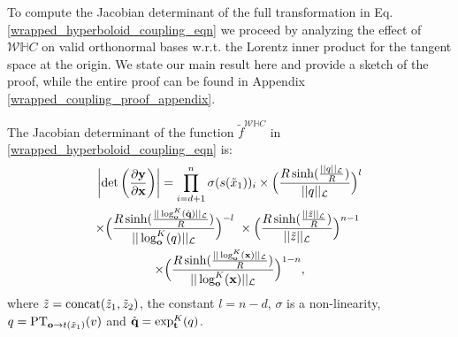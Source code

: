 To compute the Jacobian determinant of the full transformation in Eq. \ref{wrapped_hyperboloid_coupling_eqn} we proceed by analyzing the effect of $\mathcal{W}\mathbb{H}C$ on valid orthonormal bases w.r.t. the Lorentz inner product for the tangent space at the origin. We state our main result here and provide a sketch of the proof, while the entire proof can be found in Appendix \ref{wrapped_coupling_proof_appendix}. 
\begin{prop}
The Jacobian determinant of the function $\tilde{f}^{\mathcal{W}\mathbb{H}C}$ in \eqref{wrapped_hyperboloid_coupling_eqn} is:
\begin{multline}
  \left|\textnormal{det}\left(\frac{\partial\mb{y}}{\partial \mb{x}}\right)\right| = \prod_{i=d+1}^n\sigma(s(\tilde{x}_1))_i \times \Big(\frac{R \sinh(\frac{||q||_{\mathcal{L}}}{R})}{||q||_{\mathcal{L}}}\Big)^{l} \\
  \times \Big(\frac{R\sinh(\frac{||\log_{\textbf{o}}^K(\hat{\textbf{q}})||_{\mathcal{L}}}{R})}{||\log_{\textbf{o}}^K(q)||_{\mathcal{L}}}\Big)^{-l} \ \times  \Big(\frac{R\sinh(\frac{||\tilde{z}||_{\mathcal{L}}}{R})}{||\tilde{z}||_{\mathcal{L}}}\Big)^{n-1}
 \  \\ \times \Big(\frac{R\sinh(\frac{||\log_{\textbf{o}}^K(\textbf{x})||_{\mathcal{L}}}{R})}{||\log_{\textbf{o}}^K(\textbf{x})||_{\mathcal{L}}}\Big)^{1-n},
\end{multline}
where $\tilde{z} = \textnormal{concat}(\tilde{z}_1, \tilde{z}_2)$, the constant $l = n-d$, $\sigma$ is a non-linearity, $q = \textnormal{PT}_{\textbf{o}\to t(\tilde{x}_1) }(v)$ and $\hat{\textbf{q}} = \textnormal{exp}_{\textbf{t}}^K(q)$.
\end{prop}
